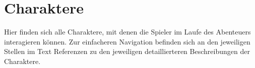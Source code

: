\chapter{Charaktere}

Hier finden sich alle Charaktere, mit denen die Spieler im Laufe des Abenteuers interagieren können.
Zur einfacheren Navigation befinden sich an den jeweiligen Stellen im Text Referenzen zu den jeweiligen detaillierteren
Beschreibungen der Charaktere.
